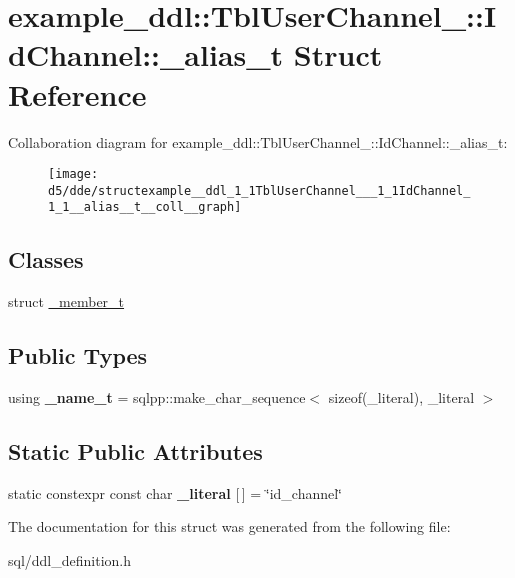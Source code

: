 \hypertarget{structexample__ddl_1_1TblUserChannel___1_1IdChannel_1_1__alias__t}{}\section{example\+\_\+ddl\+:\+:Tbl\+User\+Channel\+\_\+\+:\+:Id\+Channel\+:\+:\+\_\+alias\+\_\+t Struct Reference}
\label{structexample__ddl_1_1TblUserChannel___1_1IdChannel_1_1__alias__t}


Collaboration diagram for example\+\_\+ddl\+:\+:Tbl\+User\+Channel\+\_\+\+:\+:Id\+Channel\+:\+:\+\_\+alias\+\_\+t\+:
\nopagebreak
\begin{figure}[H]
\begin{center}
\leavevmode
\texttt{[image: d5/dde/structexample\_\_ddl\_1\_1TblUserChannel\_\_\_1\_1IdChannel\_1\_1\_\_alias\_\_t\_\_coll\_\_graph]}
\end{center}
\end{figure}
\subsection*{Classes}
\begin{DoxyCompactItemize}
\item 
struct \hyperlink{structexample__ddl_1_1TblUserChannel___1_1IdChannel_1_1__alias__t_1_1__member__t}{\+\_\+member\+\_\+t}
\end{DoxyCompactItemize}
\subsection*{Public Types}
\begin{DoxyCompactItemize}
\item 
\hypertarget{structexample__ddl_1_1TblUserChannel___1_1IdChannel_1_1__alias__t_a744ad113abe00a8190daa1b584623d65}{}using {\bfseries \+\_\+name\+\_\+t} = sqlpp\+::make\+\_\+char\+\_\+sequence$<$ sizeof(\+\_\+literal), \+\_\+literal $>$\label{structexample__ddl_1_1TblUserChannel___1_1IdChannel_1_1__alias__t_a744ad113abe00a8190daa1b584623d65}

\end{DoxyCompactItemize}
\subsection*{Static Public Attributes}
\begin{DoxyCompactItemize}
\item 
\hypertarget{structexample__ddl_1_1TblUserChannel___1_1IdChannel_1_1__alias__t_a66c36d03eb2d37203faaea1380588469}{}static constexpr const char {\bfseries \+\_\+literal} \mbox{[}$\,$\mbox{]} = \char`\"{}id\+\_\+channel\char`\"{}\label{structexample__ddl_1_1TblUserChannel___1_1IdChannel_1_1__alias__t_a66c36d03eb2d37203faaea1380588469}

\end{DoxyCompactItemize}


The documentation for this struct was generated from the following file\+:\begin{DoxyCompactItemize}
\item 
sql/ddl\+\_\+definition.\+h\end{DoxyCompactItemize}
